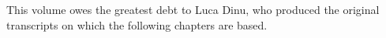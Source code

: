 \addchap{\lsAcknowledgementTitle} 

This volume owes the greatest debt to Luca Dinu, who produced the original transcripts on which the following chapters are based.
